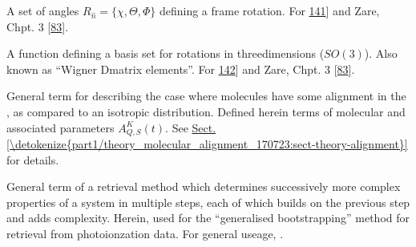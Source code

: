 \documentclass[letterpaper,table,10pt,english]{jupyterBook}
\begin{document}
\begin{description}
\sphinxAtStartPar
A set of angles \(R_{\hat{n}}=\{\chi,\Theta,\Phi\}\) defining a frame rotation. For \sphinxhref{https://en.wikipedia.org/wiki/Euler\_angles}{discussion see Wikipedia}{[}\hyperlink{cite.backmatter/bibliography:id957}{141}{]} and Zare, Chpt. 3 {[}\hyperlink{cite.backmatter/bibliography:id986}{83}{]}.

\sphinxAtStartPar
A function defining a basis set for rotations in three\sphinxhyphen{}dimensions (\(SO(3)\)). Also known as “Wigner D\sphinxhyphen{}matrix elements”. For \sphinxhref{https://en.wikipedia.org/wiki/Wigner\_D-matrix}{discussion see Wikipedia}{[}\hyperlink{cite.backmatter/bibliography:id961}{142}{]} and Zare, Chpt. 3 {[}\hyperlink{cite.backmatter/bibliography:id986}{83}{]}.

\sphinxAtStartPar
General term for describing the case where molecules have some alignment in the {\hyperref[\detokenize{backmatter/glossary:term-LF}]{}}, as compared to an isotropic distribution. Defined herein terms of molecular {\hyperref[\detokenize{backmatter/glossary:term-axis-distribution-moments}]{}} and associated parameters \(A_{Q,S}^{K}(t)\). See \hyperref[\detokenize{part1/theory_molecular_alignment_170723:sect-theory-alignment}]{Sect.\@ \ref{\detokenize{part1/theory_molecular_alignment_170723:sect-theory-alignment}}} for details.

\sphinxAtStartPar
General term of a retrieval method which determines successively more complex properties of a system in multiple steps, each of which builds on the previous step and adds complexity. Herein, used for the “generalised bootstrapping” method for {\hyperref[\detokenize{backmatter/glossary:term-radial-matrix-elements}]{}} retrieval from photoionzation data. For general useage, .

\end{description}
\end{document}
